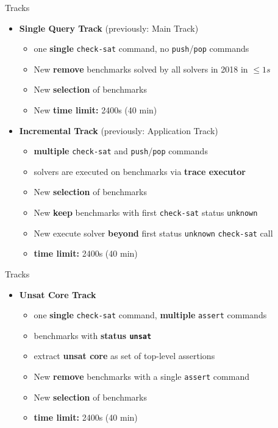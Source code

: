 \documentclass[10pt]{beamer}
\newcommand{\orange}[1]{\textcolor{mLightBrown}{#1}}
\newcommand{\akey}[1]{\texttt{#1}\xspace}
\begin{document}
  \begin{frame}{Tracks}
    \begin{itemize}
      \item \textbf{Single Query Track} (previously: Main Track)
        \begin{itemize}
          \item one \textbf{single} \akey{check-sat} command,
            no \akey{push}/\akey{pop} commands
          \item \orange{New} \textbf{remove} benchmarks solved by all solvers 
            in 2018 in $\leq 1s$
          \item \orange{New} \textbf{selection} of benchmarks
          \item \orange{New} \textbf{time limit:} 2400s (40 min)
        \end{itemize}
      \vspace{4ex}
      \item \textbf{Incremental Track} (previously: Application Track)
        \begin{itemize}
          \item \textbf{multiple} \akey{check-sat} and \akey{push}/\akey{pop} commands
          \item solvers are executed on benchmarks via \textbf{trace executor}
          \item \orange{New} \textbf{selection} of benchmarks
          \item \orange{New} \textbf{keep} benchmarks with first \akey{check-sat}
            status \akey{unknown}
          \item \orange{New} execute solver \textbf{beyond} first status
            \akey{unknown} \akey{check-sat} call
          \item \textbf{time limit:} 2400s (40 min)
        \end{itemize}
    \end{itemize}
  \end{frame}

  \begin{frame}{Tracks}
    \begin{itemize}
      \item \textbf{Unsat Core Track}
        \begin{itemize}
          \item one \textbf{single} \akey{check-sat} command,
                \textbf{multiple} \akey{assert} commands
          \item benchmarks with \textbf{status \akey{unsat}}
          \item extract \textbf{unsat core} as set of top-level assertions
          \item \orange{New} \textbf{remove} benchmarks with a single \akey{assert} command
          \item \orange{New} \textbf{selection} of benchmarks
          \item \textbf{time limit:} 2400s (40 min)
        \end{itemize}
    \end{itemize}
  \end{frame}
\end{document}
